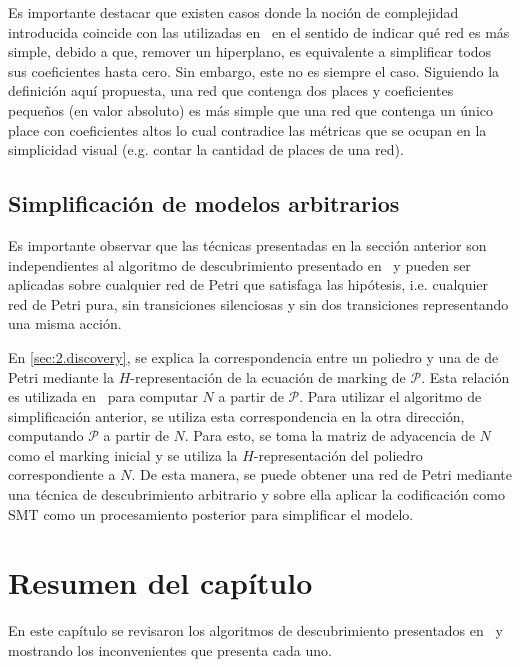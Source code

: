 Es importante destacar que existen casos donde la noción de complejidad introducida coincide con las utilizadas
en~\cite{Lassen08,Mendling2007} en el sentido de indicar qué red es más simple, debido a que, remover un hiperplano,
es equivalente a simplificar todos sus coeficientes hasta cero. Sin embargo, este no es siempre el caso.
Siguiendo la definición aquí propuesta, una red que contenga
dos places y coeficientes pequeños (en valor absoluto) es más simple que una red que contenga un único place con 
coeficientes altos lo cual contradice las métricas que se ocupan en la simplicidad visual (e.g. contar la cantidad
de places de una red).

\subsection{Simplificación de modelos arbitrarios}
\label{sec:3.simplification}

Es importante observar que las técnicas presentadas en la sección anterior son independientes al algoritmo de 
descubrimiento presentado en~\cite{CarmonaC14} y pueden ser aplicadas sobre cualquier
red de Petri que satisfaga las hipótesis, i.e. cualquier red de Petri pura, sin transiciones silenciosas y sin
dos transiciones representando una misma acción. 

En \autoref{sec:2.discovery}, se explica la correspondencia entre un poliedro y una de de Petri mediante
la $H$-representación de la ecuación de marking de $\mathcal{P}$. Esta relación es utilizada en~\cite{CarmonaC14}
para computar $N$ a partir de $\mathcal{P}$. Para utilizar el algoritmo de simplificación anterior, se utiliza
esta correspondencia en la otra dirección, computando $\mathcal{P}$ a partir de $N$. 
Para esto, se toma la matriz de adyacencia de $N$ como el marking inicial y se utiliza la 
$H$-representación del poliedro correspondiente a $N$. 
De esta manera, se puede obtener una red de Petri mediante una técnica de descubrimiento arbitrario
y sobre ella aplicar la codificación como SMT como un procesamiento posterior para simplificar el modelo.

\section{Resumen del capítulo}
\label{sec:3.resumen}

En este capítulo se revisaron los algoritmos de descubrimiento presentados en~\cite{CarmonaC14} y~\cite{LeonCB15}
mostrando los inconvenientes que presenta cada uno. 

